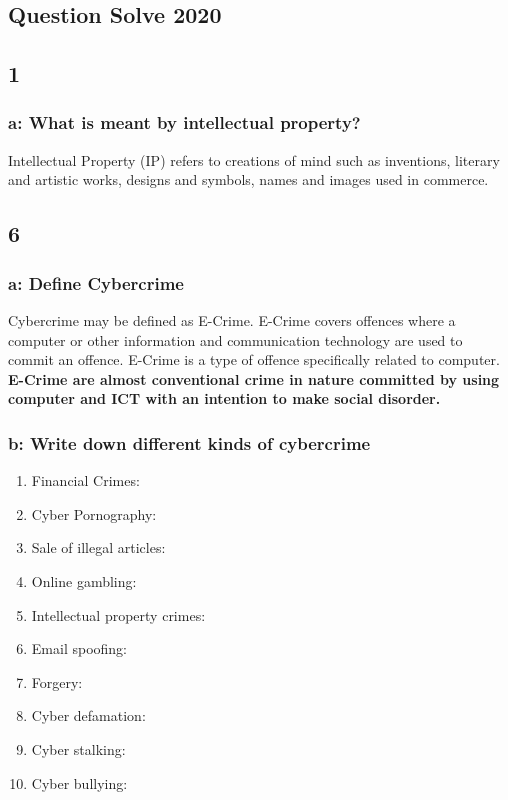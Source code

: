 \documentclass[14 pt, letterpaper]{extarticle}
\begin{document}
\begin{justify}
	\section*{Question Solve 2020}
	
	\subsection*{1}
	\subsubsection*{a: What is meant by intellectual property?}
		Intellectual Property (IP) refers to creations of mind such as inventions, literary and artistic works, designs and symbols, names and images used in commerce.
		
	\subsection*{6}
	\subsubsection*{a: Define Cybercrime}
		Cybercrime may be defined as E-Crime. E-Crime covers offences where a computer or other information and communication technology are used to commit an offence. E-Crime is a type of offence specifically related to computer. \textbf{E-Crime are almost conventional crime in nature committed by using computer and ICT with an intention to make social disorder.}
	\subsubsection*{b: Write down different kinds of cybercrime}
		\begin{enumerate}
			\item Financial Crimes:
			\item Cyber Pornography: 
			\item Sale of illegal articles:
			\item Online gambling:
			\item Intellectual property crimes:
			\item Email spoofing:
			\item Forgery:
			\item Cyber defamation: 
			\item Cyber stalking:
			\item Cyber bullying:
		\end{enumerate}
		
	\end{justify}
	
\end{document}
